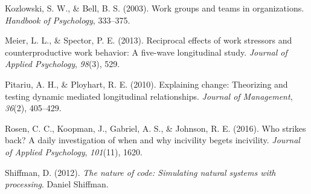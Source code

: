 \documentclass[english,,man]{apa6}
\theoremstyle{definition}
\theoremstyle{definition}
\theoremstyle{definition}
\theoremstyle{remark}
\begin{document}
\leavevmode\hypertarget{ref-kozlowski2003}{}%
Kozlowski, S. W., \& Bell, B. S. (2003). Work groups and teams in
organizations. \emph{Handbook of Psychology}, 333--375.

\leavevmode\hypertarget{ref-meier2013}{}%
Meier, L. L., \& Spector, P. E. (2013). Reciprocal effects of work
stressors and counterproductive work behavior: A five-wave longitudinal
study. \emph{Journal of Applied Psychology}, \emph{98}(3), 529.

\leavevmode\hypertarget{ref-pitariu2010}{}%
Pitariu, A. H., \& Ployhart, R. E. (2010). Explaining change: Theorizing
and testing dynamic mediated longitudinal relationships. \emph{Journal
of Management}, \emph{36}(2), 405--429.

\leavevmode\hypertarget{ref-rosen2016}{}%
Rosen, C. C., Koopman, J., Gabriel, A. S., \& Johnson, R. E. (2016). Who
strikes back? A daily investigation of when and why incivility begets
incivility. \emph{Journal of Applied Psychology}, \emph{101}(11), 1620.

\leavevmode\hypertarget{ref-shiffman2012}{}%
Shiffman, D. (2012). \emph{The nature of code: Simulating natural
systems with processing}. Daniel Shiffman.
\end{document}

